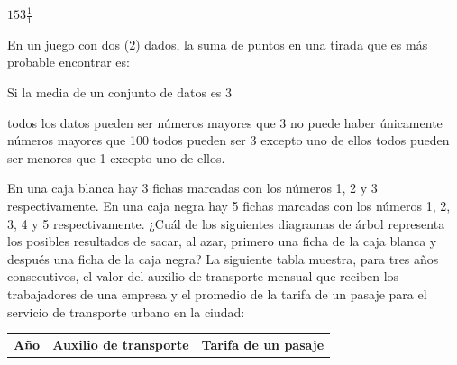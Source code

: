 \documentclass[10pt,letterpaper,addpoints]{exam}
\begin{document}
\begin{multicols}{2}
\begin{questions}
\begin{oneparchoices}
\choice $153 \frac{1}{1}$
\end{oneparchoices}
\question En un juego con dos (2) dados, la suma de puntos en una tirada que es más probable encontrar es:

\begin{oneparchoices}
\end{oneparchoices}
\question Si la media de un conjunto de datos es 3
\begin{choices}
\choice todos los datos pueden ser números mayores que 3
\CorrectChoice no puede haber únicamente números mayores que 100
\choice todos pueden ser 3 excepto uno de ellos
\choice todos pueden ser menores que 1 excepto uno de ellos.
\end{choices}
\question En una caja blanca hay 3 fichas marcadas con los números 1, 2 y 3 respectivamente. En una caja negra hay 5 fichas marcadas con los números 1, 2, 3, 4 y 5 respectivamente. ¿Cuál de los siguientes diagramas de árbol representa los posibles resultados de sacar, al
azar, primero una ficha de la caja blanca y después una ficha de la caja negra?
\question La siguiente tabla muestra, para tres años consecutivos, el valor del auxilio de transporte mensual que reciben los trabajadores de una empresa y el promedio de la tarifa de un pasaje para el servicio de transporte urbano en la ciudad:
\begin{center}
\begin{tabular}{|c|c|c|}
\hline 
\textbf{Año} & \textbf{Auxilio de transporte} & \textbf{Tarifa de un pasaje} \\ 

\end{tabular}
\end{center}
\end{questions}
\end{multicols}
\end{document}

